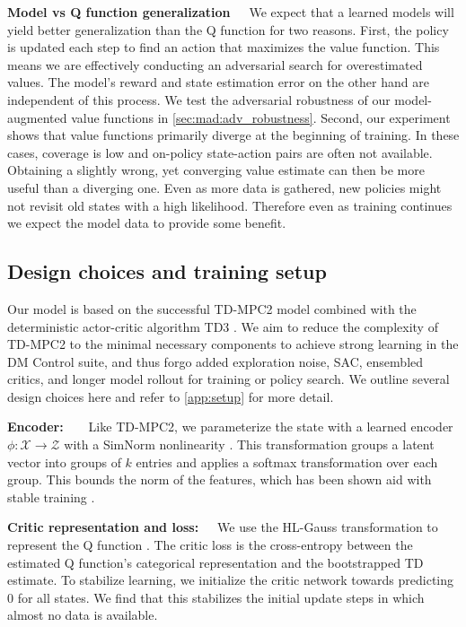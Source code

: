 \textbf{Model vs Q function generalization}~~~We expect that a learned models will yield better generalization than the Q function for two reasons.
First, the policy is updated each step to find an action that maximizes the value function.
This means we are effectively conducting an adversarial search for overestimated values.
The model's reward and state estimation error on the other hand are independent of this process.
We test the adversarial robustness of our model-augmented value functions in \autoref{sec:mad:adv_robustness}.
Second, our experiment shows that value functions primarily diverge at the beginning of training.
In these cases, coverage is low and on-policy state-action pairs are often not available.
Obtaining a slightly wrong, yet converging value estimate can then be more useful than a diverging one. 
Even as more data is gathered, new policies might not revisit old states with a high likelihood.
Therefore even as training continues we expect the model data to provide some benefit.

\subsection{Design choices and training setup}
\label{sec:mad:method}

Our model is based on the successful TD-MPC2 model \parencite{hansen2024tdmpc} combined with the deterministic actor-critic algorithm TD3 \parencite{fujimoto2018addressing}.
We aim to reduce the complexity of TD-MPC2 to the minimal necessary components to achieve strong learning in the DM Control suite, and thus forgo added exploration noise, SAC, ensembled critics, and longer model rollout for training or policy search. We outline several design choices here and refer to \autoref{app:setup} for more detail.

\textbf{Encoder:}~~~~Like TD-MPC2, we parameterize the state with a learned encoder $\phi: \mathcal{X} \rightarrow \mathcal{Z}$ with a SimNorm nonlinearity \parencite{lavoie2023simplicial}. 
This transformation groups a latent vector into groups of $k$ entries and applies a softmax transformation over each group.
This bounds the norm of the features, which has been shown aid with stable training \parencite{hussing2024dissecting,nauman2024overestimation}.

\textbf{Critic representation and loss:}~~~We use the HL-Gauss transformation to represent the Q function \parencite{farebrother2024stop}. The critic loss is the cross-entropy between the estimated Q function's categorical representation and the bootstrapped TD estimate.
To stabilize learning, we initialize the critic network towards predicting $0$ for all states.
We find that this stabilizes the initial update steps in which almost no data is available.

